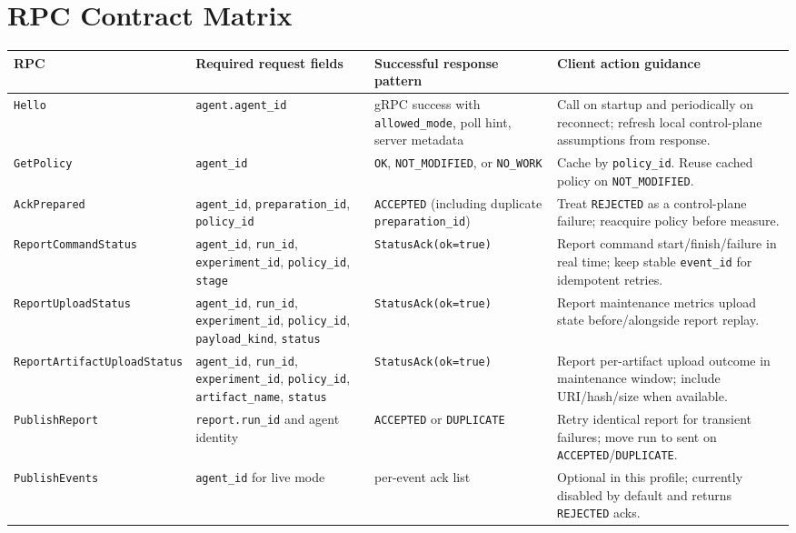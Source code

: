 \documentclass[11pt,a4paper]{article}
\begin{document}
\section{RPC Contract Matrix}
\begin{longtable}{p{2.5cm}p{3.0cm}p{4.0cm}p{4.3cm}}
\textbf{RPC} & \textbf{Required request fields} & \textbf{Successful response pattern} & \textbf{Client action guidance} \\
\hline
\endhead
\texttt{Hello} &
\texttt{agent.agent\_id} &
gRPC success with \texttt{allowed\_mode}, poll hint, server metadata &
Call on startup and periodically on reconnect; refresh local control-plane assumptions from response. \\
\texttt{GetPolicy} &
\texttt{agent\_id} &
\texttt{OK}, \texttt{NOT\_MODIFIED}, or \texttt{NO\_WORK} &
Cache by \texttt{policy\_id}. Reuse cached policy on \texttt{NOT\_MODIFIED}. \\
\texttt{AckPrepared} &
\texttt{agent\_id}, \texttt{preparation\_id}, \texttt{policy\_id} &
\texttt{ACCEPTED} (including duplicate \texttt{preparation\_id}) &
Treat \texttt{REJECTED} as a control-plane failure; reacquire policy before measure. \\
\texttt{ReportCommandStatus} &
\texttt{agent\_id}, \texttt{run\_id}, \texttt{experiment\_id}, \texttt{policy\_id}, \texttt{stage} &
\texttt{StatusAck(ok=true)} &
Report command start/finish/failure in real time; keep stable \texttt{event\_id} for idempotent retries. \\
\texttt{ReportUploadStatus} &
\texttt{agent\_id}, \texttt{run\_id}, \texttt{experiment\_id}, \texttt{policy\_id}, \texttt{payload\_kind}, \texttt{status} &
\texttt{StatusAck(ok=true)} &
Report maintenance metrics upload state before/alongside report replay. \\
\texttt{ReportArtifactUploadStatus} &
\texttt{agent\_id}, \texttt{run\_id}, \texttt{experiment\_id}, \texttt{policy\_id}, \texttt{artifact\_name}, \texttt{status} &
\texttt{StatusAck(ok=true)} &
Report per-artifact upload outcome in maintenance window; include URI/hash/size when available. \\
\texttt{PublishReport} &
\texttt{report.run\_id} and agent identity &
\texttt{ACCEPTED} or \texttt{DUPLICATE} &
Retry identical report for transient failures; move run to sent on \texttt{ACCEPTED}/\texttt{DUPLICATE}. \\
\texttt{PublishEvents} &
\texttt{agent\_id} for live mode &
per-event ack list &
Optional in this profile; currently disabled by default and returns \texttt{REJECTED} acks. \\
\hline
\end{longtable}
\end{document}
